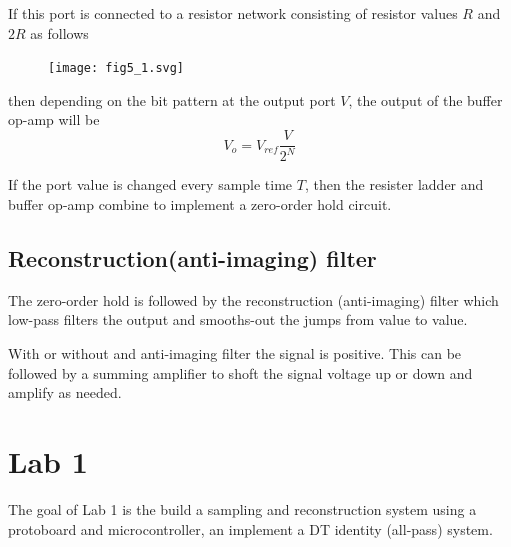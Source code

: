 \documentclass{article}
\begin{document}
If this port is connected to a resistor network consisting of resistor values $R$ and $2R$ as follows

\begin{figure}
  \centering
  \texttt{[image: fig5\_1.svg]}
\end{figure}

then depending on the bit pattern at the output port $V$, the output of the buffer op-amp will be
\[
V_o = V_{ref}\frac{V}{2^N}
\]

If the port value is changed every sample time $T$, then the resister ladder and buffer op-amp combine to implement a zero-order hold circuit.

\subsection{Reconstruction(anti-imaging) filter}

The zero-order hold is followed by the reconstruction (anti-imaging) filter which low-pass filters the output and smooths-out the jumps from value to value.

With or without and anti-imaging filter the signal is positive. This can be followed by a summing amplifier to shoft the signal voltage up or down and amplify as needed.

\section{Lab 1}

The goal of Lab 1 is the build a sampling and reconstruction system using a protoboard and microcontroller, an implement a DT identity (all-pass) system.
\end{document}

